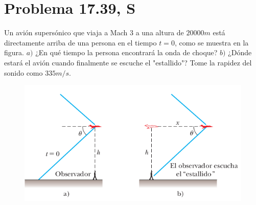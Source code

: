 \section*{Problema 17.39, S}


Un avión supersónico que viaja a Mach $3$ a una altura de $20000m$ está directamente arriba de una persona en el tiempo $t = 0$, como se muestra en la figura. $a)$ ¿En qué tiempo la persona encontrará la onda de choque? $b)$ ¿Dónde estará el avión cuando finalmente se escuche el "estallido"? Tome la rapidez del sonido como $335m/s$.

\begin{figure}[H]
	\centering
	\includegraphics[scale=0.5]{./img/choqueonda.png}
	\label{choqueonda}
\end{figure}





